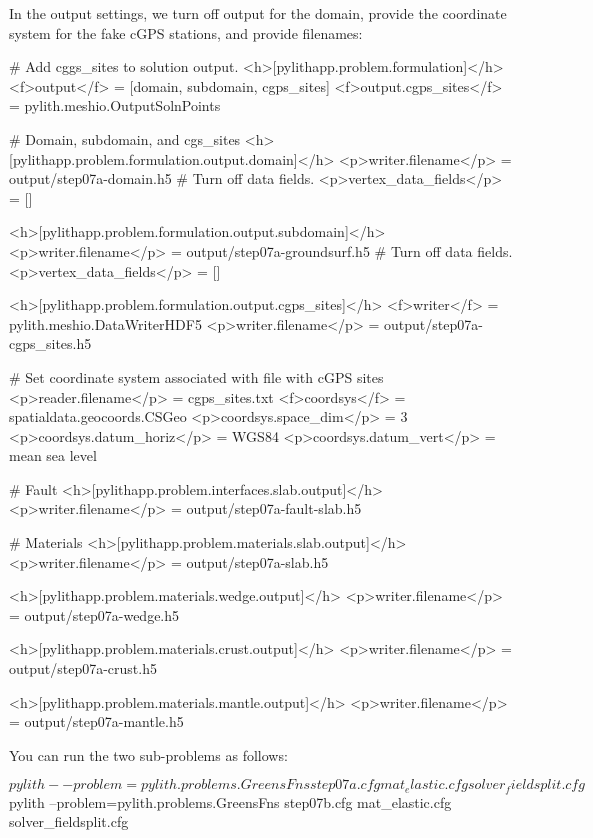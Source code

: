 In the output settings, we turn off output for the domain, provide the
coordinate system for the fake cGPS stations, and provide filenames:
\begin{cfg}
# Add cggs_sites to solution output.
<h>[pylithapp.problem.formulation]</h>
<f>output</f> = [domain, subdomain, cgps_sites]
<f>output.cgps_sites</f> = pylith.meshio.OutputSolnPoints

# Domain, subdomain, and cgs_sites
<h>[pylithapp.problem.formulation.output.domain]</h>
<p>writer.filename</p> = output/step07a-domain.h5
# Turn off data fields.
<p>vertex_data_fields</p> = []

<h>[pylithapp.problem.formulation.output.subdomain]</h>
<p>writer.filename</p> = output/step07a-groundsurf.h5
# Turn off data fields.
<p>vertex_data_fields</p> = []

<h>[pylithapp.problem.formulation.output.cgps_sites]</h>
<f>writer</f> = pylith.meshio.DataWriterHDF5
<p>writer.filename</p> = output/step07a-cgps_sites.h5

# Set coordinate system associated with file with cGPS sites
<p>reader.filename</p> = cgps_sites.txt
<f>coordsys</f> = spatialdata.geocoords.CSGeo
<p>coordsys.space_dim</p> = 3
<p>coordsys.datum_horiz</p> = WGS84
<p>coordsys.datum_vert</p> = mean sea level

# Fault
<h>[pylithapp.problem.interfaces.slab.output]</h>
<p>writer.filename</p> = output/step07a-fault-slab.h5

# Materials
<h>[pylithapp.problem.materials.slab.output]</h>
<p>writer.filename</p> = output/step07a-slab.h5

<h>[pylithapp.problem.materials.wedge.output]</h>
<p>writer.filename</p> = output/step07a-wedge.h5

<h>[pylithapp.problem.materials.crust.output]</h>
<p>writer.filename</p> = output/step07a-crust.h5

<h>[pylithapp.problem.materials.mantle.output]</h>
<p>writer.filename</p> = output/step07a-mantle.h5
\end{cfg}

You can run the two sub-problems as follows:
\begin{shell}
$$ pylith --problem=pylith.problems.GreensFns step07a.cfg
mat_elastic.cfg solver_fieldsplit.cfg
$$ pylith --problem=pylith.problems.GreensFns step07b.cfg
mat_elastic.cfg solver_fieldsplit.cfg
\end{shell}



